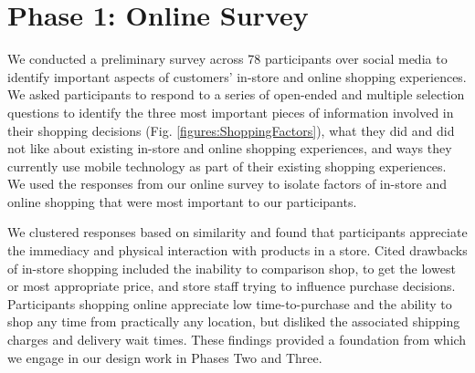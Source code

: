 \section{Phase 1: Online Survey}

We conducted a preliminary survey across 78 participants over social media to identify important aspects of customers' in-store and online shopping experiences. We asked participants to respond to a series of open-ended and multiple selection questions to identify the three most important pieces of information involved in their shopping decisions (Fig. \ref{figures:ShoppingFactors}), what they did and did not like about existing in-store and online shopping experiences, and ways they currently use mobile technology as part of their existing shopping experiences. We used the responses from our online survey to isolate factors of in-store and online shopping that were most important to our participants. 

We clustered responses based on similarity and found that participants appreciate the immediacy and physical interaction with products in a store. Cited drawbacks of in-store shopping included the inability to comparison shop, to get the lowest or most appropriate price, and store staff trying to influence purchase decisions.  Participants shopping online appreciate low time-to-purchase and the ability to shop any time from practically any location, but disliked the associated shipping charges and delivery wait times. These findings provided a foundation from which we engage in our design work in Phases Two and Three. 